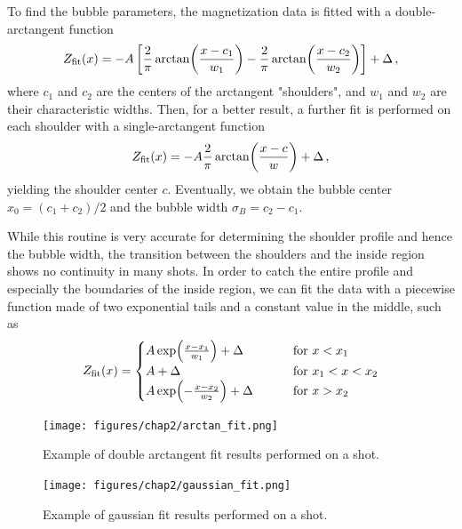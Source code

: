 To find the bubble parameters, the magnetization data is fitted with a double-arctangent function
\begin{equation}
    Z_{\rm fit}(x) = -A \left[\frac{2}{\pi}\arctan(\frac{x-c_1}{w_1}) - \frac{2}{\pi}\arctan(\frac{x-c_2}{w_2})\right] + \Delta\, ,
    \label{eq:double-atan}
\end{equation}
where $c_1$ and $c_2$ are the centers of the arctangent "shoulders", and $w_1$ and $w_2$ are their characteristic widths. Then, for a better result, a further fit is performed on each shoulder with a single-arctangent function
\begin{equation*}
    Z_{\rm fit}(x) = -A \frac{2}{\pi}\arctan(\frac{x-c}{w}) + \Delta\, ,
\end{equation*}
yielding the shoulder center $c$. Eventually, we obtain the bubble center $x_0 = (c_1 + c_2)/2$ and the bubble width $\sigma_B = c_2 - c_1$.


While this routine is very accurate for determining the shoulder profile and hence the bubble width, the transition between the shoulders and the inside region shows no continuity in many shots. In order to catch the entire profile and especially the boundaries of the inside region, we can fit the data with a piecewise function made of two exponential tails and a constant value in the middle, such as
\begin{equation*}
    Z_{\rm fit}(x) = 
    \begin{cases}
        A \exp(\frac{x-x_1}{w_1}) + \Delta \qquad\quad &\text{for } x < x_1\\
        A + \Delta \qquad\qquad\qquad\qquad &\text{for } x_1 < x < x_2\\
        A \exp(-\frac{x-x_2}{w_2}) + \Delta \qquad &\text{for } x > x_2
    \end{cases}
\end{equation*}

\begin{figure}[h!]
    \centering
    \begin{minipage}[t]{0.47 \textwidth}
        \centering
        \texttt{[image: figures/chap2/arctan\_fit.png]}
        \caption{Example of double arctangent fit results performed on a shot.}
        \label{fig:atan-fit}
    \end{minipage}
    \hspace{0.02\textwidth}
    \begin{minipage}[t]{0.47 \textwidth}
        \centering
        \texttt{[image: figures/chap2/gaussian\_fit.png]}
        \caption{Example of gaussian fit results performed on a shot.}
        \label{fig:gaussian-fit}
    \end{minipage}
\end{figure}


